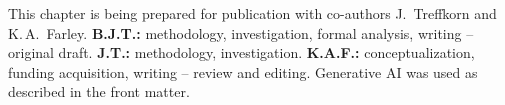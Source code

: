 \begin{chaptercredit}
This chapter is being prepared for publication with co-authors J.\ Treffkorn and K.\,A.\ Farley.
\textbf{B.J.T.:} methodology, investigation, formal analysis, writing -- original draft.
\textbf{J.T.:} methodology, investigation.
\textbf{K.A.F.:} conceptualization, funding acquisition, writing -- review and editing.
Generative AI was used as described in the front matter.
\end{chaptercredit}
